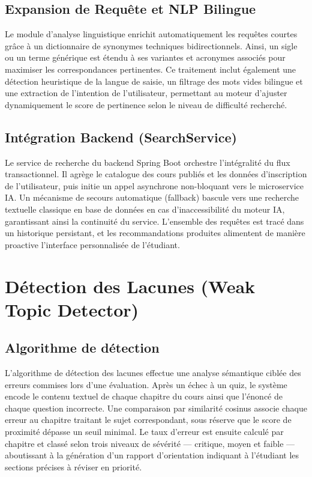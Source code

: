\documentclass[12pt,a4paper]{report}
\begin{document}
\subsection{Expansion de Requête et NLP Bilingue}

Le module d'analyse linguistique enrichit automatiquement les requêtes courtes grâce à un dictionnaire de synonymes techniques bidirectionnels. Ainsi, un sigle ou un terme générique est étendu à ses variantes et acronymes associés pour maximiser les correspondances pertinentes. Ce traitement inclut également une détection heuristique de la langue de saisie, un filtrage des mots vides bilingue et une extraction de l'intention de l'utilisateur, permettant au moteur d'ajuster dynamiquement le score de pertinence selon le niveau de difficulté recherché.

\subsection{Intégration Backend (SearchService)}

Le service de recherche du backend Spring Boot orchestre l'intégralité du flux transactionnel. Il agrège le catalogue des cours publiés et les données d'inscription de l'utilisateur, puis initie un appel asynchrone non-bloquant vers le microservice IA. Un mécanisme de secours automatique (fallback) bascule vers une recherche textuelle classique en base de données en cas d'inaccessibilité du moteur IA, garantissant ainsi la continuité du service. L'ensemble des requêtes est tracé dans un historique persistant, et les recommandations produites alimentent de manière proactive l'interface personnalisée de l'étudiant.

\section{Détection des Lacunes (Weak Topic Detector)}

\subsection{Algorithme de détection}

L'algorithme de détection des lacunes effectue une analyse sémantique ciblée des erreurs commises lors d'une évaluation. Après un échec à un quiz, le système encode le contenu textuel de chaque chapitre du cours ainsi que l'énoncé de chaque question incorrecte. Une comparaison par similarité cosinus associe chaque erreur au chapitre traitant le sujet correspondant, sous réserve que le score de proximité dépasse un seuil minimal. Le taux d'erreur est ensuite calculé par chapitre et classé selon trois niveaux de sévérité — critique, moyen et faible — aboutissant à la génération d'un rapport d'orientation indiquant à l'étudiant les sections précises à réviser en priorité.
\end{document}
